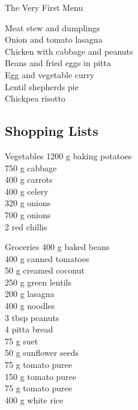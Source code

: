 
    
		\begin{menu}{The Very First Menu}

    Meat stew and dumplings\\
    Onion and tomato lasagna\\
    Chicken with cabbage and peanuts\\
    Beans and fried eggs in pitta\\
    Egg and vegetable curry\\
    Lentil shepherds pie\\
    Chickpea risotto\\
    
    \subsection*{Shopping Lists}
      \begin{shoppinglist}{Vegetables}
      1200 g baking potatoes \\ 
      750 g cabbage \\ 
      400 g carrots \\ 
      400 g celery \\ 
      320 g onions \\ 
      700 g onions \\ 
      2  red chillis \\ 
      \end{shoppinglist}%
      \begin{shoppinglist}{Groceries}
      400 g baked beans \\ 
      400 g canned tomatoes \\ 
      50 g creamed coconut \\ 
      250 g green lentils \\ 
      200 g lasagna \\ 
      400 g noodles \\ 
      3 tbsp peanuts \\ 
      4  pitta bread \\ 
      75 g suet \\ 
      50 g sunflower seeds \\ 
      75 g tomato puree \\ 
      150 g tomato puree \\ 
      75 g tomato puree \\ 
      400 g white rice \\ 

\end{shoppinglist}
\end{menu}
